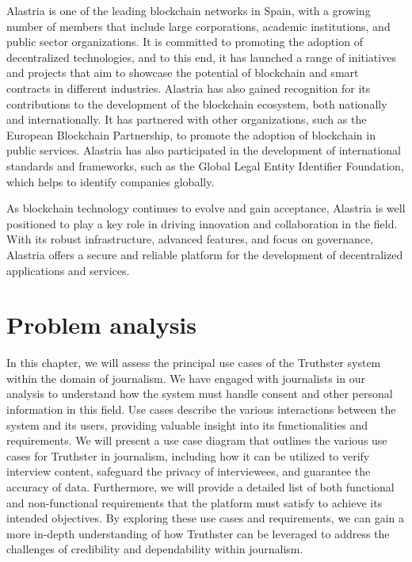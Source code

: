\documentclass[target=mst,aauheader=]{thud}
\begin{document}
    Alastria is one of the leading blockchain networks in Spain, with a growing number of members that include large corporations, academic institutions, and public sector organizations. It is committed to promoting the adoption of decentralized technologies, and to this end, it has launched a range of initiatives and projects that aim to showcase the potential of blockchain and smart contracts in different industries.
    Alastria has also gained recognition for its contributions to the development of the blockchain ecosystem, both nationally and internationally. It has partnered with other organizations, such as the European Blockchain Partnership, to promote the adoption of blockchain in public services. Alastria has also participated in the development of international standards and frameworks, such as the Global Legal Entity Identifier Foundation, which helps to identify companies globally.

    As blockchain technology continues to evolve and gain acceptance, Alastria is well positioned to play a key role in driving innovation and collaboration in the field. With its robust infrastructure, advanced features, and focus on governance, Alastria offers a secure and reliable platform for the development of decentralized applications and services.

\chapter{Problem analysis}
\label{problemAnalysis}

In this chapter, we will assess the principal use cases of the Truthster system within the domain of journalism. We have engaged with journalists in our analysis to understand how the system must handle consent and other personal information in this field. Use cases describe the various interactions between the system and its users, providing valuable insight into its functionalities and requirements. We will present a use case diagram that outlines the various use cases for Truthster in journalism, including how it can be utilized to verify interview content, safeguard the privacy of interviewees, and guarantee the accuracy of data. Furthermore, we will provide a detailed list of both functional and non-functional requirements that the platform must satisfy to achieve its intended objectives. By exploring these use cases and requirements, we can gain a more in-depth understanding of how Truthster can be leveraged to address the challenges of credibility and dependability within journalism.
\end{document}
